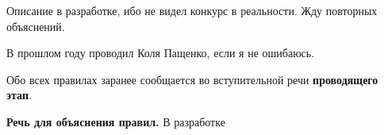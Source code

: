 
\par Описание в разработке, ибо не видел конкурс в реальности. Жду повторных объяснений.

\par В прошлом году проводил Коля Пащенко, если я не ошибаюсь.

\par Обо всех правилах заранее сообщается во вступительной речи \textbf{проводящего этап}.

\par \textbf{Речь для объяснения правил.} В разработке